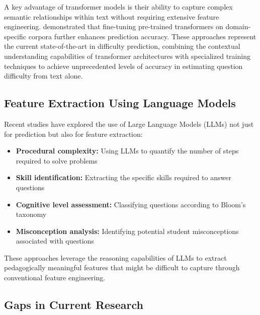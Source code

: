 \documentclass[11pt]{article}
\begin{document}
A key advantage of transformer models is their ability to capture complex semantic relationships within text without requiring extensive feature engineering. \citet{aradelli2020transformers} demonstrated that fine-tuning pre-trained transformers on domain-specific corpora further enhances prediction accuracy. These approaches represent the current state-of-the-art in difficulty prediction, combining the contextual understanding capabilities of transformer architectures with specialized training techniques to achieve unprecedented levels of accuracy in estimating question difficulty from text alone.

\subsection{Feature Extraction Using Language Models}

Recent studies have explored the use of Large Language Models (LLMs) not just for prediction but also for feature extraction:

\begin{itemize}
    \item \textbf{Procedural complexity:} Using LLMs to quantify the number of steps required to solve problems \citep{liu2023improving} %
    \item \textbf{Skill identification:} Extracting the specific skills required to answer questions \citep{didolkar2024metacognitive} %
    \item \textbf{Cognitive level assessment:} Classifying questions according to Bloom's taxonomy \citep{scaria2024automated} %
    \item \textbf{Misconception analysis:} Identifying potential student misconceptions associated with questions \citep{sadihin2024proposalml} %
\end{itemize}

These approaches leverage the reasoning capabilities of LLMs to extract pedagogically meaningful features that might be difficult to capture through conventional feature engineering.

\subsection{Gaps in Current Research}
\end{document}
